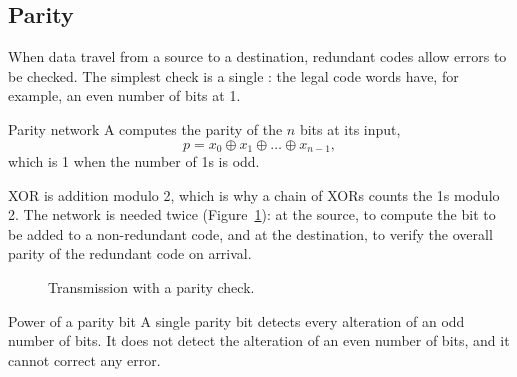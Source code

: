 \subsection{Parity}

When data travel from a source to a destination, redundant codes allow errors
to be checked. The simplest check is a single : the legal
code words have, for example, an even number of bits at 1.

\begin{definition}{Parity network}
A  computes the parity of the $n$ bits at its input,
\[ p=x_0\oplus x_1\oplus\dots\oplus x_{n-1}, \]
which is 1 when the number of 1s is odd.
\end{definition}

XOR is addition modulo 2, which is why a chain of XORs counts the 1s modulo 2.
The network is needed twice (Figure~\ref{fig:cm:parity}): at the source, to
compute the bit to be added to a non-redundant code, and at the destination,
to verify the overall parity of the redundant code on arrival.

\begin{figure}[htb]
\centering
{}
\caption{Transmission with a parity check.}
\label{fig:cm:parity}
\end{figure}

\begin{theorem}{Power of a parity bit}
A single parity bit detects every alteration of an odd number of bits. It
does not detect the alteration of an even number of bits, and it cannot
correct any error.
\end{theorem}


